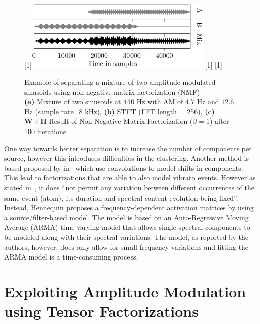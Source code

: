 \begin{figure}[H]
\centering
{}%
[1\textwidth]{\includegraphics[width=0.8\textwidth]{Chapters/05_Separation_Known/figures/Timepdf-crop.pdf}}%
\hspace{0.2\textwidth} %
[1\textwidth]{}%
\hspace{0.3\textwidth} %
[1\textwidth]{}%
\caption{Example of separating a mixture of two amplitude modulated sinusoids using non-negative matrix factorization (NMF)\\ \textbf{(a)} Mixture of two sinusoids at $440$ Hz with AM of $4.7$ Hz and $12.6$ Hz (sample rate=$8$ kHz), \textbf{(b)} STFT (FFT length = 256), \textbf{(c)} $\mathbf{W} \times \mathbf{H}$ Result of Non-Negative Matrix Factorization ($\beta = 1$) after 100 iterations}
\label{fig:am_tensor_nmf}
\end{figure}

One way towards better separation is to increase the number of components per source, however this introduces difficulties in the clustering.
Another method is based proposed by in~\cite{smaragdis04, fitzgerald05s, jaiswal13, rodriguezserrano16} which use convolutions to model shifts in components.
This lead to factorizations that are able to also model vibrato events.
However as stated in~\cite{hennequin11}, it does ``not  permit  any variation  between  different  occurrences  of  the  same  event (atom), its duration and spectral content evolution being fixed''. 
Instead, Hennequin proposes a frequency-dependent activation matrices by using a source/filter-based model.
The model is based on an Auto-Regressive Moving Average (ARMA) time varying model that allows single spectral components to be modeled along with their spectral variations. 
The model, as reported by the authors, however, does only allow for small frequency variations and fitting the ARMA model is a time-consuming process.

\section{Exploiting Amplitude Modulation using Tensor Factorizations}
\label{sub:am}

